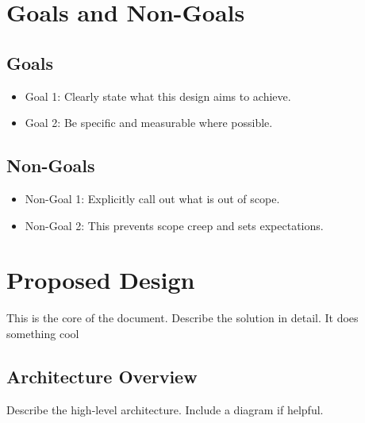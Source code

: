 \documentclass[11pt, a4paper]{article}
\begin{document}
\section{Goals and Non-Goals}

\subsection*{Goals}
\begin{itemize}
    \item Goal 1: Clearly state what this design aims to achieve.
    \item Goal 2: Be specific and measurable where possible.
\end{itemize}

\subsection*{Non-Goals}
\begin{itemize}
    \item Non-Goal 1: Explicitly call out what is out of scope.
    \item Non-Goal 2: This prevents scope creep and sets expectations.
\end{itemize}

\section{Proposed Design}

This is the core of the document. Describe the solution in detail. It does something cool

\subsection{Architecture Overview}

Describe the high-level architecture. Include a diagram if helpful.

\end{document}
